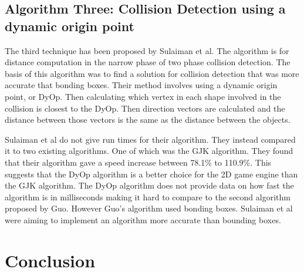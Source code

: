 \documentclass{scrartcl}
\begin{document}
\subsection{Algorithm Three: Collision Detection using a dynamic origin point }
The third technique has been proposed by Sulaiman et al.\cite{Sulaiman} The algorithm is for distance computation in the narrow phase of two phase collision detection. The basis of this algorithm was to find a solution for collision detection that was more accurate that bonding boxes. Their method involves using a dynamic origin point, or DyOp. Then calculating which vertex in each shape involved in the collision is closest to the DyOp. Then direction vectors are calculated and the distance between those vectors is the same as the distance between the objects. 


Sulaiman et al do not give run times for their algorithm. They instead compared it to two existing algorithms. One of which was the GJK  algorithm. They found that their algorithm gave a speed increase  between 78.1\% to 110.9\%. This suggests that the DyOp algorithm is a better choice for the 2D game engine than the GJK algorithm. The DyOp algorithm does not provide data on how fast the algorithm is in milliseconds making it hard to compare to the second algorithm proposed by Guo. However Guo’s algorithm used bonding boxes. Sulaiman et al were aiming to implement an algorithm more accurate than bounding boxes.



\section{Conclusion}





\end{document}
